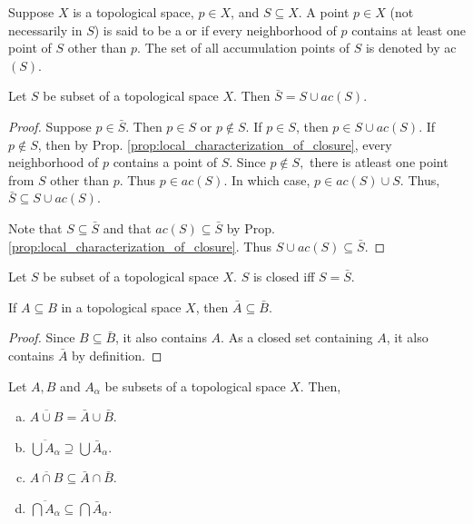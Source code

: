 \documentclass[11pt,a4paper]{article}
\begin{document}
\begin{definition}
Suppose $X$ is a topological space, $p\in X$, and $S\subseteq X$. A point $p\in X$ (not necessarily in $S$) is said to be a  or  if every neighborhood of $p$ contains at least one point of $S$ other than $p$. The set of all accumulation points of $S$ is denoted by ac$(S)$.
\end{definition}

\begin{proposition}
Let $S$ be subset of a topological space $X$. Then $\bar{S} = S\cup ac(S)$.
\end{proposition}

\begin{proof}
\forward Suppose $p\in \bar{S}$. Then $p\in S$ or $p\notin S$. If $p\in S$, then $p\in S\cup ac(S)$. If $p\notin S$, then by Prop. \ref{prop:local_characterization_of_closure}, every neighborhood of $p$ contains a point of $S$. Since $p\notin S,$ there is atleast one point from $S$ other than $p$. Thus $p\in ac(S)$. In which case, $p\in ac(S)\cup S$. Thus, $\bar{S}\subseteq S\cup ac(S)$.

\noindent\converse Note that $S\subseteq \bar{S}$ and that $ac(S)\subseteq \bar{S}$ by Prop. \ref{prop:local_characterization_of_closure}. Thus $S\cup ac(S)\subseteq \bar{S}$.
\end{proof}

\begin{proposition}
Let $S$ be subset of a topological space $X$. $S$ is closed iff $S = \bar{S}$.
\end{proposition}

\begin{proposition}\label{prop:subsets_closure}
If $A\subseteq B$ in a topological space $X$, then $\bar{A}\subseteq\bar{B}$.
\end{proposition}

\begin{proof}
Since $B\subseteq \bar{B}$, it also contains $A$. As a closed set containing $A$, it also contains $\bar{A}$ by definition. 
\end{proof}

\begin{proposition}
Let $A, B$ and $A_\alpha$ be subsets of a topological space $X$. Then,
\begin{enumerate}[(a)]
    \item $\overline{A\cup B} = \bar{A}\cup \bar{B}$.
    \item $\overline{\bigcup A_\alpha} \supseteq \bigcup \bar{A}_\alpha$.
    \item $\overline{A\cap B} \subseteq \bar{A}\cap \bar{B}$.
    \item $\overline{\bigcap A_\alpha} \subseteq \bigcap \bar{A}_\alpha$.
\end{enumerate}
\end{proposition}
\end{document}
